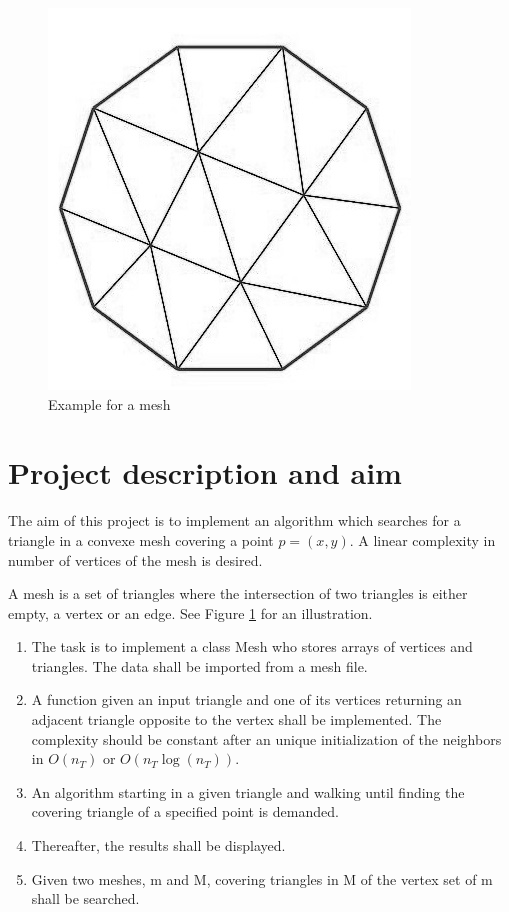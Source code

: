 \documentclass[10pt]{article}
\begin{document}
\begin{figure} \label{fig:ex_mesh}
	\begin{center}
		\includegraphics[width=0.6\linewidth]{../Figures/ex_mesh}
	\end{center}
	\caption{Example for a mesh}
\end{figure}

\section{Project description and aim}

The aim of this project is to implement an algorithm which searches for a triangle in a convexe mesh covering a point $p = (x,y)$. A linear complexity in number of vertices of the mesh is desired.

A mesh is a set of triangles where the intersection of two triangles is either empty, a vertex or an edge. See Figure \ref{fig:ex_mesh} for an illustration.

\begin{enumerate}
	\item The task is to implement a class {\ttfamily Mesh} who stores arrays of vertices and triangles. The data shall be imported from a mesh file.
	\item A function given an input triangle and one of its vertices returning an adjacent triangle opposite to the vertex shall be implemented. The complexity should be constant after an unique initialization  of the neighbors in $O(n_T)$ or $O(n_T \log(n_T))$.
	\item An algorithm starting in a given triangle and walking until finding the covering triangle of a specified point is demanded.
	\item Thereafter, the results shall be displayed.
	\item Given two meshes, {\ttfamily m} and {\ttfamily M}, covering triangles in {\ttfamily M} of the vertex set of {\ttfamily m} shall be searched.
\end{enumerate}
\end{document}
